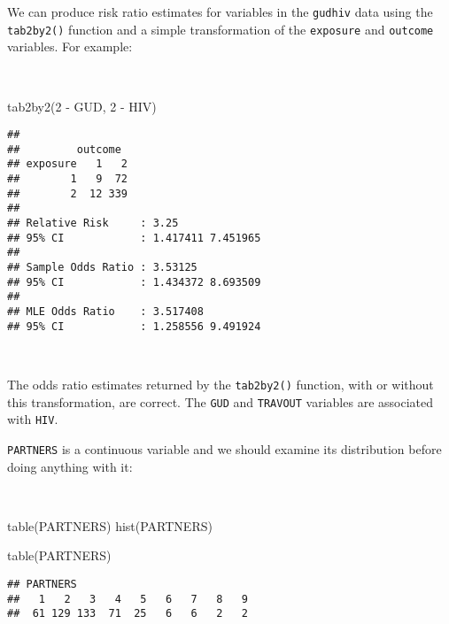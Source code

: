 \documentclass[
  12pt,
  a4paper]{book}
\newenvironment{Shaded}{\begin{snugshade}}{\end{snugshade}}
\newcommand{\DecValTok}[1]{\textcolor[rgb]{0.00,0.00,0.81}{#1}}
\newcommand{\FunctionTok}[1]{\textcolor[rgb]{0.00,0.00,0.00}{#1}}
\newcommand{\NormalTok}[1]{#1}
\newcommand{\SpecialCharTok}[1]{\textcolor[rgb]{0.00,0.00,0.00}{#1}}
\begin{document}
\newpage

We can produce risk ratio estimates for variables in the \texttt{gudhiv} data using the \texttt{tab2by2()} function and a
simple transformation of the \texttt{exposure} and \texttt{outcome} variables. For example:

~

\begin{Shaded}
\begin{Highlighting}[]
\FunctionTok{tab2by2}\NormalTok{(}\DecValTok{2} \SpecialCharTok{{-}}\NormalTok{ GUD, }\DecValTok{2} \SpecialCharTok{{-}}\NormalTok{ HIV)}
\end{Highlighting}
\end{Shaded}

\begin{verbatim}
## 
##         outcome
## exposure   1   2
##        1   9  72
##        2  12 339
## 
## Relative Risk     : 3.25 
## 95% CI            : 1.417411 7.451965 
## 
## Sample Odds Ratio : 3.53125 
## 95% CI            : 1.434372 8.693509 
## 
## MLE Odds Ratio    : 3.517408 
## 95% CI            : 1.258556 9.491924
\end{verbatim}

~

The odds ratio estimates returned by the \texttt{tab2by2()} function, with or without this transformation, are correct. The \texttt{GUD} and \texttt{TRAVOUT} variables are associated with \texttt{HIV}.

\texttt{PARTNERS} is a continuous variable and we should examine its distribution before doing anything with it:

~

\begin{Shaded}
\begin{Highlighting}[]
\FunctionTok{table}\NormalTok{(PARTNERS)}
\FunctionTok{hist}\NormalTok{(PARTNERS)}
\end{Highlighting}
\end{Shaded}

\begin{Shaded}
\begin{Highlighting}[]
\FunctionTok{table}\NormalTok{(PARTNERS)}
\end{Highlighting}
\end{Shaded}

\begin{verbatim}
## PARTNERS
##   1   2   3   4   5   6   7   8   9 
##  61 129 133  71  25   6   6   2   2
\end{verbatim}
\end{document}
